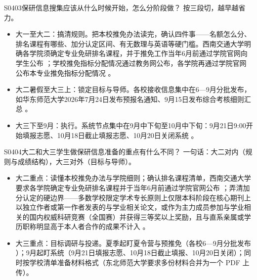 \begin{qa}{S0403}{保研信息搜集应该从什么时候开始，怎么分阶段做？}
按三段切，越早越省力。
\begin{itemize}
  \item 大一至大二：搞清规则。把本校推免办法读完，确认四件事——名额怎么分、排名课程有哪些、加分认定区间、有无数理与英语等硬门槛。西南交通大学明确各学院须确定专业免研排名课程，并于推免工作当年6月前通过学院官网向学生公布 ；学校推免指标分配情况通过教务网公布，各学院再通过学院官网公布本专业推免指标分配情况 。
  \item 大二暑假至大三上：锁定目标与导师。各校接收信息集中在6—9月分批发布，如华东师范大学2026年7月24日发布预报名通知、9月15日发布综合考核细则汇总 。
  \item 大三下至9月：执行。系统节点集中在9月中下旬至10月中下旬：9月21日9:00开始填报志愿、10月18日截止填报志愿、10月20日关闭系统 。
\end{itemize}
\end{qa}

\begin{qa}{S0404}{大二和大三学生做保研信息准备的重点有什么不同？}
一句话：大二对内（规则与成绩结构），大三对外（目标与导师）。
\begin{itemize}
  \item 大二重点：读懂本校推免办法与学院细则；确认排名课程清单，西南交通大学要求各学院确定专业免研排名课程并于当年6月前通过学院官网公布 ；弄清加分认定的硬边界——多数学校限定学术专长原则上仅限本科阶段在核心期刊上以独立作者或第一作者发表的与学业相关论文，或作为主力成员参加与学业相关的国内权威科研竞赛（全国赛）并获得三等奖以上奖励，且与直系亲属或学历职称明显高于本人者合作的成果不计入 。
  \item 大三重点：目标调研与投递。夏季起盯夏令营与预推免（各校6—9月分批发布 ）；9月起盯系统（9月21日填报志愿、10月18日截止填报、10月20日关闭）；同时按学校清单准备材料格式（东北师范大学要求多份材料合并为一个 PDF 上传）。
\end{itemize}
\end{qa}


